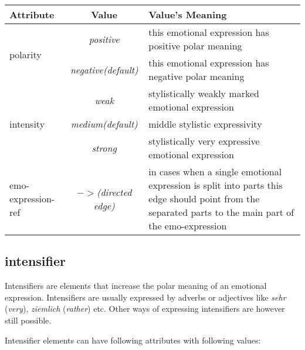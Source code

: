 \documentclass[11pt,a4paper]{article}
\newlength\clmnwidth
\begin{document}
\begin{tabular}{|l|c|p{\clmnwidth}|}\hline
  Attribute & Value & Value's Meaning\\\hline

  \multirow{2}{*}{polarity} & \textit{positive} & this emotional
  expression has positive polar meaning\\\cline{2-3}

  & \textit{negative\newline(default)} & this emotional expression has
  negative polar meaning\\\hline


  \multirow{3}{*}{intensity} & \textit{weak} & stylistically weakly
  marked emotional expression\\\cline{2-3}

  & \textit{medium\newline(default)} & middle stylistic
  expressivity\\\cline{2-3}

  & \textit{strong} & stylistically very expressive emotional
  expression\\\hline


  emo-expression-ref & \textit{$->$\newline(directed edge)} & in cases
  when a single emotional expression is split into parts this edge
  should point from the separated parts to the main part of the
  emo-expression\\\hline
\end{tabular}

\subsection{intensifier}
Intensifiers are elements that increase the polar meaning of an
emotional expression.  Intensifiers are usually expressed by adverbs
or adjectives like \textit{sehr} (\textit{very}), \textit{ziemlich}
(\textit{rather}) etc.  Other ways of expressing intensifiers are
however still possible.

Intensifier elements can have following attributes with following
values:
\end{document}
